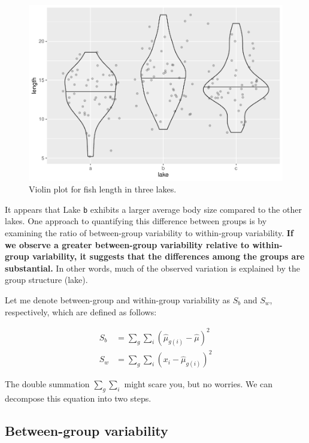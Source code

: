 \documentclass[
]{book}
\begin{document}
\begin{figure}

{\centering \includegraphics{_main_files/figure-latex/violin-1} 

}

\caption{Violin plot for fish length in three lakes.}\label{fig:violin}
\end{figure}

It appears that Lake \texttt{b} exhibits a larger average body size compared to the other lakes. One approach to quantifying this difference between groups is by examining the ratio of between-group variability to within-group variability. \textbf{If we observe a greater between-group variability relative to within-group variability, it suggests that the differences among the groups are substantial.} In other words, much of the observed variation is explained by the group structure (lake).

Let me denote between-group and within-group variability as \(S_b\) and \(S_w\), respectively, which are defined as follows:

\[
\begin{aligned}
S_b &= \sum_g \sum_i (\hat{\mu}_{g(i)} - \hat{\mu})^2\\
S_w &= \sum_g \sum_i (x_{i} - \hat{\mu}_{g(i)})^2
\end{aligned}
\]

The double summation \(\sum_g \sum_i\) might scare you, but no worries. We can decompose this equation into two steps.

\hypertarget{between-group-variability}{%
\subsection{Between-group variability}\label{between-group-variability}}
\end{document}

